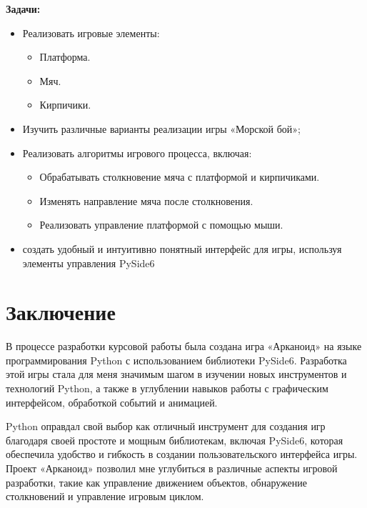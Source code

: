 \documentclass[14pt, oneside]{altsu-report}
\begin{document}
\textbf{Задачи:}
\begin{itemize}
\item Реализовать игровые элементы:
\begin{itemize}
    \item Платформа.
    \item Мяч.
    \item Кирпичики.
\end{itemize}
\item Изучить различные варианты реализации игры «Морской бой»;
\item Реализовать алгоритмы игрового процесса, включая:
\begin{itemize}
    \item Обрабатывать столкновение мяча с платформой и кирпичиками.
    \item Изменять направление мяча после столкновения.
    \item Реализовать управление платформой с помощью мыши.
\end{itemize}
\item создать удобный и интуитивно понятный интерфейс для игры, используя элементы управления PySide6
\end{itemize}





\chapter*{Заключение}

В процессе разработки курсовой работы была создана игра «Арканоид» на языке программирования Python с использованием библиотеки PySide6. Разработка этой игры стала для меня значимым шагом в изучении новых инструментов и технологий Python, а также в углублении навыков работы с графическим интерфейсом, обработкой событий и анимацией.

Python оправдал свой выбор как отличный инструмент для создания игр благодаря своей простоте и мощным библиотекам, включая PySide6, которая обеспечила удобство и гибкость в создании пользовательского интерфейса игры. Проект «Арканоид» позволил мне углубиться в различные аспекты игровой разработки, такие как управление движением объектов, обнаружение столкновений и управление игровым циклом.
\end{document}
